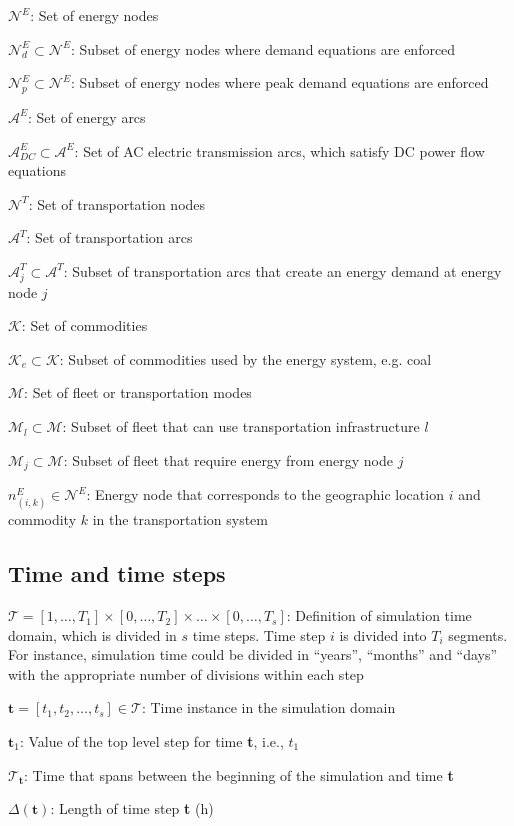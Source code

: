 \documentclass{article}
\begin{document}
\begin{description}
\item $\mathcal{N}^E$: Set of energy nodes
\item $\mathcal{N}^E_d \subset \mathcal{N}^E$: Subset of energy nodes where demand equations are enforced
\item $\mathcal{N}^E_p \subset \mathcal{N}^E$: Subset of energy nodes where peak demand equations are enforced
\item $\mathcal{A}^E$: Set of energy arcs
\item $\mathcal{A}^E_{DC} \subset \mathcal{A}^E$: Set of AC electric transmission arcs, which satisfy DC power flow equations
\item $\mathcal{N}^T$: Set of transportation nodes
\item $\mathcal{A}^T$: Set of transportation arcs
\item $\mathcal{A}^T_j \subset \mathcal{A}^T$: Subset of transportation arcs that create an energy demand at energy node $j$
\item $\mathcal{K}$: Set of commodities
\item $\mathcal{K}_e \subset \mathcal{K}$: Subset of commodities used by the energy system, e.g. coal
\item $\mathcal{M}$: Set of fleet or transportation modes
\item $\mathcal{M}_l \subset \mathcal{M}$: Subset of fleet that can use transportation infrastructure $l$
\item $\mathcal{M}_j \subset \mathcal{M}$: Subset of fleet that require energy from energy node $j$
\item $n^E_{(i,k)} \in \mathcal{N}^E$: Energy node that corresponds to the geographic location $i$  and commodity $k$ in the transportation system
\end{description}


\subsection{Time and time steps}

\begin{description}
\item $\mathcal{T} = [1, \ldots, T_1] \times [0, \dots, T_2] \times \ldots \times [0, \ldots, T_s]$: Definition of simulation time domain, which is divided in $s$ time steps. Time step $i$ is divided into $T_i$ segments. For instance, simulation time could be divided in ``years'', ``months'' and ``days'' with the appropriate number of divisions within each step
\item $\textbf{t} = [t_1, t_2, \ldots, t_s] \in \mathcal{T}$: Time instance in the simulation domain
\item $\textbf{t}_1$: Value of the top level step for time \textbf{t}, i.e., $t_1$
\item $\mathcal{T}_\textbf{t}$: Time that spans between the beginning of the simulation and time \textbf{t}
\item $\Delta(\textbf{t})$: Length of time step \textbf{t} (h)
\end{description}
\end{document}
